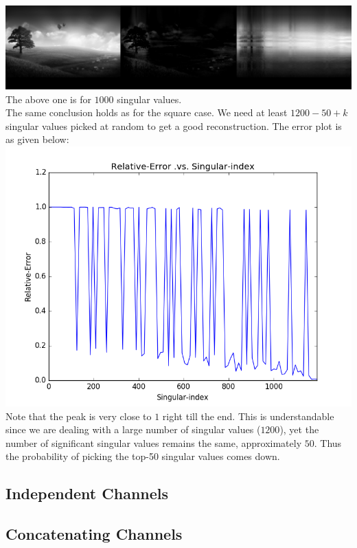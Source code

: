 \documentclass{article}
\begin{document}
\includegraphics[width =\textwidth]{SVD/a/Rect/True/recon1000.png}\\
The above one is for $1000$ singular values.\\

The same conclusion holds as for the square case. We need at least $1200 - 50 + k$ singular values picked at random to get a good reconstruction. The error plot is as given below:\\
\includegraphics[width =\textwidth]{SVD/a/Rect/True/error.png}\\

Note that the peak is very close to $1$ right till the end. This is understandable since we are dealing with a large number of singular values ($1200$), yet the number of significant singular values remains the same, approximately $50$. Thus the probability of picking the top-50 singular values comes down.


\newpage
\subsection{Independent Channels}

\newpage
\subsection{Concatenating Channels}
\end{document}
